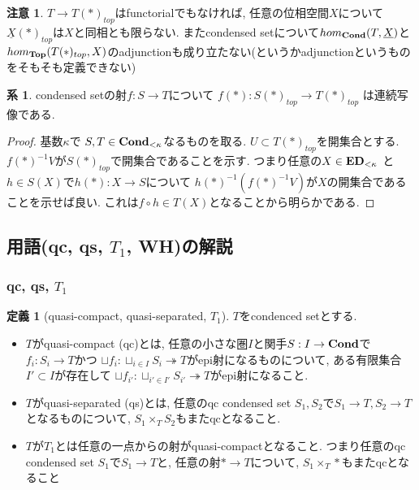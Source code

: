 \documentclass[dvipdfmx,a4paper,11pt]{report}
\theoremstyle{definition}
\newtheorem{cor}[thm]{系}
\newtheorem{dfn}[thm]{定義}
\newtheorem{rem}[thm]{注意}
\begin{document}
\begin{rem}
$T \to T(\ast)_{top}$はfunctorialでもなければ, 任意の位相空間$X$について$\underline{X}(\ast)_{top}$は$X$と同相とも限らない. またcondensed setについて$hom_{{\bf Cond}}(T,\underline{X})$と$hom_{{\bf Top}}(T(\ast)_{top}, X)$のadjunctionも成り立たない(というかadjunctionというものをそもそも定義できない)
\end{rem}
  \begin{tcolorbox}
 [colback = white, colframe = green!35!black, fonttitle = \bfseries,breakable = true]
  \begin{cor}
  condensed setの射$f : S\to T$について
  $f(\ast) : S(\ast)_{top} \to T(\ast)_{top}$
  は連続写像である.
 \end{cor}
  \end{tcolorbox}
 \begin{proof}
 基数$\kappa$で
 $S, T \in {\bf Cond}_{< \kappa}$なるものを取る.
 $U \subset T(\ast)_{top}$を開集合とする. 
 $f(\ast)^{-1}V$が$S(\ast)_{top} $で開集合であることを示す.
 つまり任意の$X \in {\bf ED}_{<\kappa}$ と$h \in S(X)$で$h(\ast): X \to S$について
 $h(\ast)^{-1}(f(\ast)^{-1}V)$が$X$の開集合であることを示せば良い.
 これは$f \circ h \in T(X)$となることから明らかである. 
 \end{proof}


\subsection{用語(qc, qs, $T_1$, WH)の解説}
\subsubsection{qc, qs, $T_1$}

 \begin{tcolorbox}
 [colback = white, colframe = green!35!black, fonttitle = \bfseries,breakable = true]
\begin{dfn}[quasi-compact, quasi-separated, $T_1$]
$T$をcondenced setとする. 
\begin{itemize}
\item $T$がquasi-compact (qc)とは, 任意の小さな圏$I$と関手$S : I \to {\bf Cond}$で$f_i : S_i \to T$かつ
$\sqcup f_i : \sqcup_{i \in I} S_i \twoheadrightarrow T$がepi射になるものについて, 
ある有限集合$I' \subset I$が存在して
$\sqcup f_{i'} : \sqcup_{i' \in I'} S_{i'} \twoheadrightarrow T$がepi射になること.
\item $T$がquasi-separated (qs)とは, 任意のqc condensed set $S_1, S_2$で$S_1 \to T, S_2\to T$となるものについて, $S_1 \times_{T}S_2$もまたqcとなること.
\item $T$が$T_1$とは任意の一点からの射がquasi-compactとなること. 
つまり任意のqc condensed set $S_1$で$S_1 \to T$と, 任意の射$\ast \to T$について, $S_1 \times_{T}\ast$もまたqcとなること 
\end{itemize}
\end{dfn}
 \end{tcolorbox}
 
\end{document}
